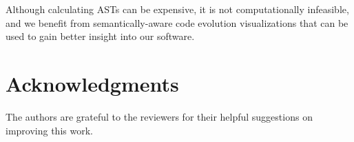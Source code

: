 Although calculating ASTs can be expensive, it is not computationally infeasible, and we benefit from semantically-aware code evolution visualizations that can be used to gain better insight into our software.


\section*{Acknowledgments}

The authors are grateful to the reviewers for their helpful suggestions on improving this work.





